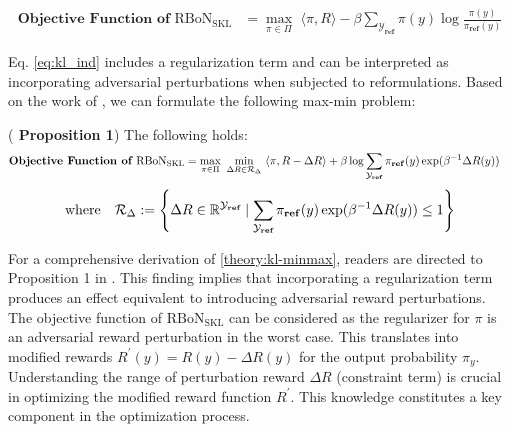 \begin{equation}\label{eq:kl_ind}
\begin{aligned}
\textbf{Objective Function of $\mathrm{RBoN}_{\mathrm{SKL}}$} &= \max_{\pi \in \Pi}  \,\, \langle \pi, R \rangle - \beta \sum_\mathcal{Y_{\textbf{ref}}} \pi (y)\log{\frac{\pi(y)}{\pi_{\textbf{ref}} (y)}}
\end{aligned}
\end{equation}


Eq. \ref{eq:kl_ind} includes a regularization term and can be interpreted as incorporating adversarial perturbations when subjected to reformulations. Based on the work of \citet{brekelmans2022your}, we can formulate the following max-min problem:
\begin{theorem}(\textbf{\cite{brekelmans2022your} Proposition 1})\label{theory:kl-minmax}
The following holds:
\begin{equation*}
\begin{aligned}
\textnormal{\textbf{Objective Function of $\mathrm{RBoN}_{\mathrm{SKL}}$}}&=\max_{\pi \in \Pi} \,\, \min_{\Delta R \in \mathcal{R}_{\Delta}} \,\, \langle \pi, R - \Delta R \rangle  +  \beta \log \sum_\mathcal{Y_{\textnormal{\textbf{ref}}}} \pi_{\textnormal{\textbf{ref}}}(y) \exp(\beta^{-1}\Delta R(y)) 
\end{aligned}
\end{equation*}
\begin{equation*}
\text{where}\quad \mathcal{R}_{\Delta}:=\left\{\Delta R \in \mathbb{R}^{\mathcal{Y}_{\textbf{ref}}} \mid \sum_\mathcal{Y_{\textbf{ref}}} \pi_{\textnormal{\textbf{ref}}}(y) \exp(\beta^{-1}\Delta R(y)) \leq 1\right\}
\end{equation*}
\end{theorem}

For a comprehensive derivation of \cref{theory:kl-minmax}, readers are directed to Proposition 1 in \cite{brekelmans2022your}. This finding implies that incorporating a regularization term produces an effect equivalent to introducing adversarial reward perturbations. The objective function of $\mathrm{RBoN}_{\mathrm{SKL}}$ can be considered as the regularizer for $\pi$ is an adversarial reward perturbation in the worst case. This translates into modified rewards $R^{\prime}(y)=R(y)-\Delta R(y)$ for the output probability $\pi_y$. Understanding the range of perturbation reward $\Delta R$ (constraint term) is crucial in optimizing the modified reward function $R^\prime$. This knowledge constitutes a key component in the optimization process. 



